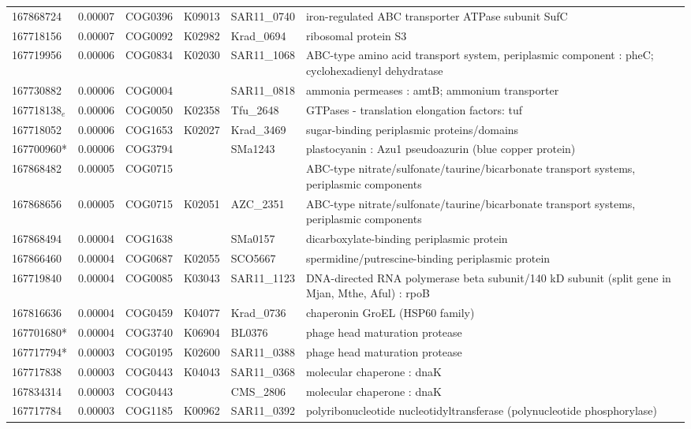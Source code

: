 \begin{landscape}
\begin{longtable}{p{1.6cm}p{1.2cm}p{1.5cm}p{1.5cm}p{2.8cm}p{13.5cm}}
167868724 & 0.00007 & COG0396 & K09013 & SAR11\_0740 & iron-regulated ABC transporter ATPase subunit SufC \\
167718156 & 0.00007 & COG0092 & K02982 & Krad\_0694 & ribosomal protein S3 \\
167719956 & 0.00006 & COG0834 & K02030 & SAR11\_1068 & ABC-type amino acid transport system,  periplasmic component : pheC; cyclohexadienyl dehydratase \\
167730882 & 0.00006 & COG0004 &  & SAR11\_0818 & ammonia permeases : amtB; ammonium transporter \\
167718138$_e$ & 0.00006 & COG0050 & K02358 & Tfu\_2648 & GTPases - translation elongation factors: tuf \\
167718052 & 0.00006 & COG1653 & K02027 & Krad\_3469 & sugar-binding periplasmic proteins/domains \\
167700960* & 0.00006 & COG3794 &  & SMa1243 & plastocyanin :  Azu1 pseudoazurin (blue copper protein) \\
167868482 & 0.00005 & COG0715 &  &  & ABC-type nitrate/sulfonate/taurine/bicarbonate transport systems,  periplasmic components \\
167868656 & 0.00005 & COG0715 & K02051 & AZC\_2351 & ABC-type nitrate/sulfonate/taurine/bicarbonate transport systems,  periplasmic components \\
167868494 & 0.00004 & COG1638 &  & SMa0157 & dicarboxylate-binding periplasmic protein \\
167866460 & 0.00004 & COG0687 & K02055 & SCO5667 & spermidine/putrescine-binding periplasmic protein \\
167719840 & 0.00004 & COG0085 & K03043 & SAR11\_1123 & DNA-directed RNA polymerase beta subunit/140 kD subunit (split gene in Mjan,  Mthe,  Aful) : rpoB \\
167816636 & 0.00004 & COG0459 & K04077 & Krad\_0736 & chaperonin GroEL (HSP60 family) \\
167701680* & 0.00004 & COG3740 & K06904 & BL0376 & phage head maturation protease \\
167717794* & 0.00003 & COG0195 & K02600 & SAR11\_0388 & phage head maturation protease \\
167717838 & 0.00003 & COG0443 & K04043 & SAR11\_0368 & molecular chaperone : dnaK \\
167834314 & 0.00003 & COG0443 &  & CMS\_2806 & molecular chaperone : dnaK \\
167717784 & 0.00003 & COG1185 & K00962 & SAR11\_0392 & polyribonucleotide nucleotidyltransferase (polynucleotide phosphorylase) \\

\end{longtable}
\end{landscape}
